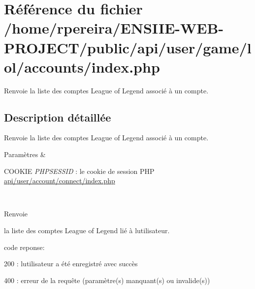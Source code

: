 \hypertarget{game_2lol_2accounts_2index_8php}{}\section{Référence du fichier /home/rpereira/\+E\+N\+S\+I\+I\+E-\/\+W\+E\+B-\/\+P\+R\+O\+J\+E\+C\+T/public/api/user/game/lol/accounts/index.php}
\label{game_2lol_2accounts_2index_8php}


Renvoie la liste des comptes League of Legend associé à un compte.  




\subsection{Description détaillée}
Renvoie la liste des comptes League of Legend associé à un compte. 


\begin{DoxyParams}{Paramètres}
{\em } & 
\begin{DoxyItemize}
\item C\+O\+O\+K\+IE {\itshape P\+H\+P\+S\+E\+S\+S\+ID} \+: le cookie de session P\+HP \hyperlink{account_2connect_2index_8php}{api/user/account/connect/index.\+php} 
\end{DoxyItemize}\\
\hline
\end{DoxyParams}
\begin{DoxyReturn}{Renvoie}

\begin{DoxyItemize}
\item la liste des comptes League of Legend lié à l\textquotesingle{}utilisateur.
\item code reponse\+:
\begin{DoxyItemize}
\item 200 \+: l\textquotesingle{}utilisateur a été enregistré avec succès
\item 400 \+: erreur de la requête (paramètre(s) manquant(s) ou invalide(s)) 
\end{DoxyItemize}
\end{DoxyItemize}
\end{DoxyReturn}
